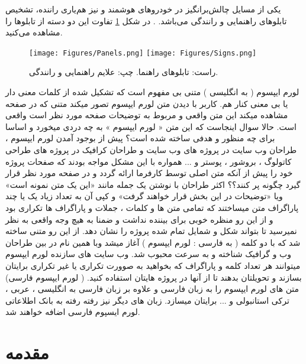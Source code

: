 \documentclass[oneside,openany,msc]{SBU-Thesis}
\begin{document}
	یکی از مسایل چالش‌برانگیز در خودروهای هوشمند و نیز هم‌یاری راننده‌، تشخیص تابلوهای راهنمایی و رانندگی می‌باشد. \cite{Gonzalez2014}. در شکل
	\ref{fig:signs} 
	تفاوت این دو دسته از تابلوها را مشاهده می‌کنید.
	
	
	\begin{figure}[t]
		\centering
		\texttt{[image: Figures/Panels.png]}
		\texttt{[image: Figures/Signs.png]}
		\caption[تابلوی راهنما و علایم رانندگی]{راست: تابلوهای راهنما. چپ: علایم راهنمایی و رانندگی. }
		\label{fig:signs}
	\end{figure}
	
	لورم ایپسوم ( به انگلیسی  ) متنی بی مفهوم است که تشکیل شده از کلمات معنی دار یا بی معنی کنار هم. کاربر با دیدن متن لورم ایپسوم تصور میکند متنی که در صفحه مشاهده میکند این متن واقعی و مربوط به توضیحات صفحه مورد نظر است واقعی است. حالا سوال اینجاست که این متن « لورم ایپسوم » به چه دردی میخورد و اساسا برای چه منظور و هدفی ساخته شده است؟ پیش از بوجود آمدن لورم ایپسوم ، طراحان وب سایت در پروژه های وب سایت و طراحان کرافیک در پروژه های طراحی کاتولوگ ، بروشور ، پوستر و ... همواره با این مشکل مواجه بودند که صفحات پروژه خود را پیش از آنکه متن اصلی توسط کارفرما ارائه گردد و در صفحه مورد نظر قرار گیرد چگونه پر کنند؟؟ اکثر طراحان با نوشتن یک جمله مانند «این یک متن نمونه است» ویا «توضیحات در این بخش قرار خواهند گرفت» و کپی آن به تعداد زیاد یک یا چند پاراگراف متن میساختند که تمامی متن ها و کلمات ، جملات و پاراگراف ها تکراری بود و از این رو منظره خوبی برای بیننده نداشت و ضمنا به هیچ وجه واقعی به نظر نمیرسید تا بتواند شکل و شمایل تمام شده پروژه را نشان دهد. از این رو متنی ساخته شد که با دو کلمه ( به فارسی : لورم ایپسوم ) آغاز میشد وبا همین نام در بین طراحان وب و گرافیک شناخته و به سرعت محبوب شد. وب سایت های سازنده لورم ایپسوم میتوانند هر تعداد کلمه و پاراگراف که بخواهید به صوورت تکراری یا غیر تکراری برایتان بسازند و تحویلتان بدهند تا از آنها در پروژه هایتان استفاده کنید. ( لورم ایپسوم فارسی) متن های لورم ایپسوم را به زبان فارسی و علاوه بر زبان فارسی به انگلیسی ، عربی ، ترکی استانبولی و ... برایتان میسازد. زبان های دیگر نیز رفته رفته به بانک اطلاعاتی لورم ایسپوم فارسی اضافه خواهند شد.  
	
	
	\label{chap:lit}
	\section{مقدمه}
	
\end{document}
